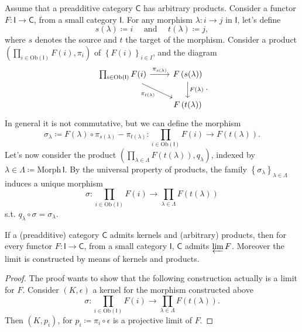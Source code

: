 \begin{rem}
	Assume that a preadditive category $\mathsf{C}$ has arbitrary products.
	Consider a functor $F\colon \mathsf{I} \to \mathsf{C}$, from a small category $\mathsf{I}$.
	For any morphism $\lambda\colon i \to j$ in $\mathsf{I}$, let's define
	\begin{equation}
		s(\lambda) \coloneqq i \quad \text{ and } \quad t(\lambda) \coloneqq j
	,\end{equation} 
	where $s$ denotes the source and $t$ the target of the morphism.
	Consider a product
	$\left(\prod_{i \in \mathrm{Ob} \left(\mathsf{I}\right)} F(i),  \pi_i \right)$
	of $\left\{ F(i) \right\}_{i \in I}$, and the diagram
	\begin{equation}
	\begin{tikzcd}
		\prod_{i \in \mathrm{Ob} \left(\mathsf{I}\right)} F(i) \arrow[r, "\pi_{s(\lambda)}", rightarrow] 
		\arrow[rd, "\pi_{t(\lambda)}"', rightarrow] &
		F \left( s(\lambda) \right) \arrow[d, "F(\lambda)", rightarrow] \\
		& F \left( t(\lambda) \right)
	\end{tikzcd}
	.\end{equation} 
	In general it is not commutative, but we can define the morphism
	\begin{equation}
		\sigma_\lambda \coloneqq F(\lambda) \circ \pi_{s(\lambda)} - \pi_{t(\lambda)}\colon \prod_{i \in \mathrm{Ob} \left(\mathsf{I}\right)} F(i) \to F \left( t(\lambda) \right)
	.\end{equation} 
	Let's now consider the product $\left(\prod_{\lambda \in \Lambda} F \left( t(\lambda) \right), q_\lambda\right)$, indexed by $\lambda \in \Lambda \coloneqq \mathrm{Morph}\, \mathsf{I}$.
	By the universal property of products, the family $\left\{ \sigma_\lambda \right\}_{\lambda \in \Lambda}$ induces a unique morphism
	 \begin{equation}
		 \sigma\colon \prod_{i \in \mathrm{Ob} \left(\mathsf{I}\right)} F(i) \to \prod_{\lambda \in \Lambda} F \left( t(\lambda) \right)
	\end{equation} 
	s.t. $q_\lambda \circ\sigma = \sigma_\lambda$.
\end{rem}

\begin{prop}\label{prop:LimConstr}
	If a (preadditive) category $\mathsf{C}$ admits kernels and (arbitrary) products,
	then for every functor $F\colon \mathsf{I} \to \mathsf{C}$, from a small category $\mathsf{I}$, 
	$\mathsf{C}$ admits $\varprojlim F$.
	Moreover the limit is constructed by means of kernels and products.
\end{prop} 
\begin{proof}
	The proof wants to show that the following construction actually is a limit for $F$.
	Consider $\left(K, \epsilon\right)$ a kernel for the morphism constructed above
	\begin{equation}
		\sigma\colon \prod_{i \in \mathrm{Ob} \left(\mathsf{I}\right)} F(i) \to \prod_{\lambda \in \Lambda} F \left( t(\lambda) \right)
	.\end{equation} 
	Then $\left(K, p_i\right)$, for $p_i \coloneqq \pi_i \circ\epsilon$ is a projective limit of $F$.
\end{proof}

